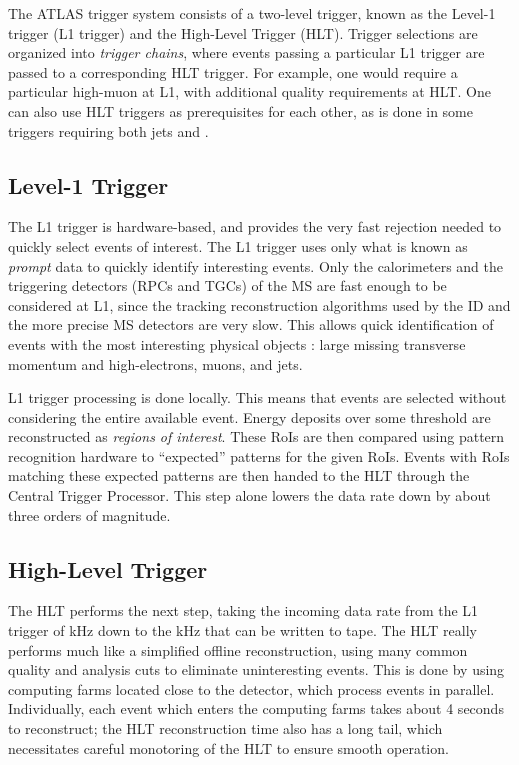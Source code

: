 The ATLAS trigger system consists of a two-level trigger, known as the Level-1 trigger (L1 trigger) and the High-Level Trigger (HLT)\footnotemark.
Trigger selections are organized into \textit{trigger chains}, where events passing a particular L1 trigger are passed to a corresponding HLT trigger.
For example, one would require a particular high-\pt muon at L1, with additional quality requirements at HLT.
One can also use HLT triggers as prerequisites for each other, as is done in some triggers requiring both jets and \met.

\subsection{Level-1 Trigger}

The L1 trigger is hardware-based, and provides the very fast rejection needed to quickly select events of interest.
The L1 trigger uses only what is known as \textit{prompt} data to quickly identify interesting events.
Only the calorimeters and the triggering detectors (RPCs and TGCs)  of the MS are fast enough to be considered at L1, since the tracking reconstruction algorithms used by the ID and the more precise MS detectors are very slow.
This allows quick identification of events with the most interesting physical objects : large missing transverse momentum and high-\pt electrons, muons, and jets.

L1 trigger processing is done locally.
This means that events are selected without considering the entire available event.
Energy deposits over some threshold are reconstructed as \textit{regions of interest}.
These RoIs are then compared using pattern recognition hardware to ``expected'' patterns for the given RoIs.
Events with RoIs matching these expected patterns are then handed to the HLT through the Central Trigger Processor.
This step alone lowers the data rate down by about three orders of magnitude.

\subsection{High-Level Trigger}

The HLT performs the next step, taking the incoming data rate from the L1 trigger of  kHz down to the  kHz that can be written to tape.
The HLT really performs much like a simplified offline reconstruction, using many common quality and analysis cuts to eliminate uninteresting events.
This is done by using computing farms located close to the detector, which process events in parallel.
Individually, each event which enters the computing farms takes about 4 seconds to reconstruct; the HLT reconstruction time also has a long tail, which necessitates careful monotoring of the HLT to ensure smooth operation.

